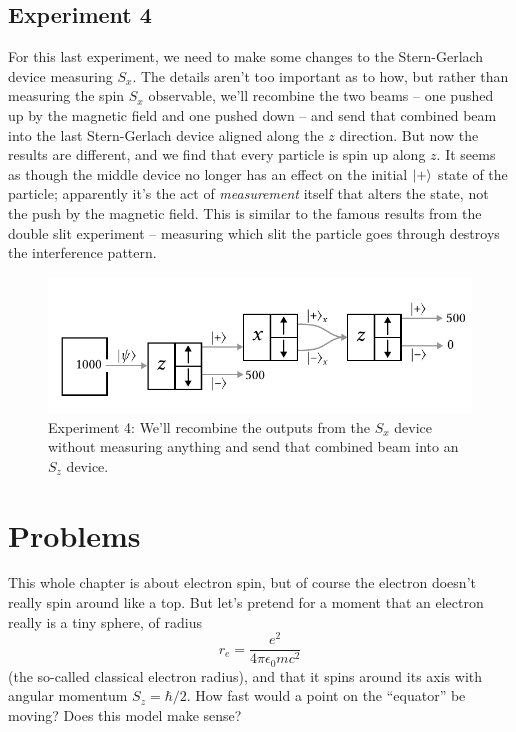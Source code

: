 \subsection{Experiment 4}

For this last experiment, we need to make some changes to the Stern-Gerlach device measuring $S_x$.  The details aren't too important as to how, but rather than measuring the spin $S_x$ observable, we'll recombine the two beams -- one pushed up by the magnetic field and one pushed down -- and send that combined beam into the last Stern-Gerlach device aligned along the $z$ direction.  But now the results are different, and we find that every particle is spin up along $z$.  It seems as though the middle device no longer has an effect on the initial $| + \rangle$ state of the particle; apparently it's the act of \emph{measurement} itself that alters the state, not the push by the magnetic field.  This is similar to the famous results from the double slit experiment -- measuring which slit the particle goes through destroys the interference pattern.

\begin{figure}
\centering\includegraphics[width=\linewidth]{Figures/Chapter 1/fig_sg_4.pdf}
\caption{Experiment 4: We'll recombine the outputs from the $S_x$ device without measuring anything and send that combined beam into an $S_z$ device. }
\label{fig_sg_4}
\end{figure}


%
%
%



\section*{Problems}
%

\begin{problem}
This whole chapter is about electron spin, but of course the electron doesn't really spin around like a top.  But let's pretend for a moment that an electron really is a tiny sphere, of radius
\[
r_e = \frac{e^2}{4\pi \epsilon_0 mc^2}
\]
(the so-called classical electron radius), and that it spins around its axis with angular momentum $S_z = \hbar/2$.  How fast would a point on the ``equator'' be moving?  Does this model make sense? 
\end{problem}

